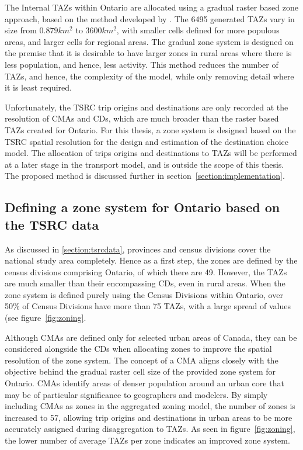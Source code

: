 The Internal TAZs within Ontario are allocated using a gradual raster based zone approach, based on the method developed by \textcite{moeckel2015gradual}. The 6495 generated TAZs vary in size from $0.879 km^2$ to $3600km^2$, with smaller cells defined for more populous areas, and larger cells for regional areas. The gradual zone system is designed on the premise that it is desirable to have larger zones in rural areas where there is less population, and hence, less activity. This method reduces the number of TAZs, and hence, the complexity of the model, while only removing detail where it is least required. 


Unfortunately, the TSRC trip origins and destinations are only recorded at the resolution of CMAs and CDs, which are much broader than the raster based TAZs created for Ontario. For this thesis, a zone system is designed based on the TSRC spatial resolution for the design and estimation of the destination choice model. The allocation of trips origins and destinations to TAZs will be performed at a later stage in the transport model, and is outside the scope of this thesis. The proposed method is discussed further in section~\ref{section:implementation}.


\subsection{Defining a zone system for Ontario based on the TSRC data}
\label{section:zoning}
As discussed in \ref{section:tsrcdata}, provinces and census divisions cover the national study area completely. Hence as a first step, the zones are defined by the census divisions comprising Ontario, of which there are 49. However, the TAZs are much smaller than their encompassing CDs, even in rural areas. When the zone system is defined purely using the Census Divisions within Ontario, over 50\% of Census Divisions have more than 75 TAZs, with a large spread of values (see figure~\ref{fig:zoning}. 

Although CMAs are defined only for selected urban areas of Canada, they can be considered alongside the CDs when allocating zones to improve the spatial resolution of the zone system. The concept of a CMA aligns closely with the objective behind the gradual raster cell size of the provided zone system for Ontario. CMAs identify areas of denser population around an urban core that may be of particular significance to geographers and modelers. By simply including CMAs as zones in the aggregated zoning model, the number of zones is increased to 57, allowing trip origins and destinations in urban areas to be more accurately assigned during disaggregation to TAZs. As seen in figure~\ref{fig:zoning}, the lower number of average TAZs per zone indicates an improved zone system. 

